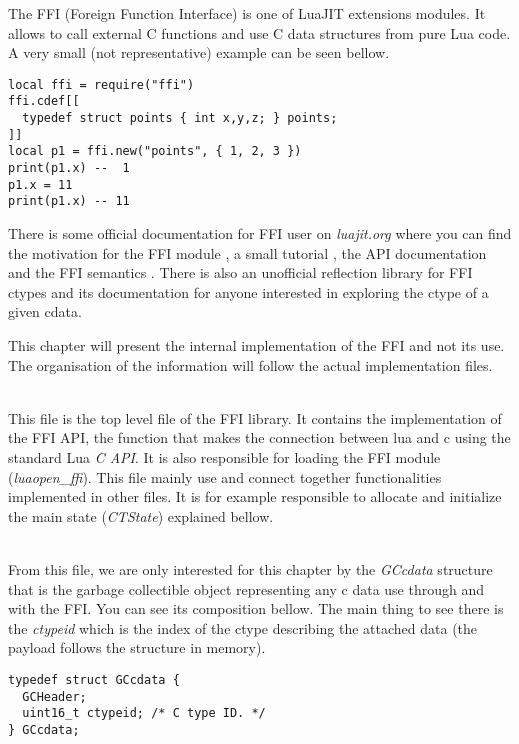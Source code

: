
The FFI (Foreign Function Interface) is one of LuaJIT extensions modules. It
allows to call external C functions and use C data structures from pure Lua code.
A very small (not representative) example can be seen bellow.

\begin{lstlisting}[style=myLuastyle]
local ffi = require("ffi")
ffi.cdef[[
  typedef struct points { int x,y,z; } points;
]]
local p1 = ffi.new("points", { 1, 2, 3 })
print(p1.x) --  1
p1.x = 11
print(p1.x) -- 11
\end{lstlisting}
There is some official documentation for FFI user on \emph{luajit.org}
where you can find the motivation for the FFI module \cite{ffi-motivation},
a small tutorial \cite{ffi-tuto}, the API documentation \cite{ffi-api} and the
FFI semantics \cite{ffi-semantics}. There is also an unofficial reflection
library for FFI ctypes \cite{ffi-reflect} and its documentation
\cite{ffi-reflect-doc} for anyone interested in exploring the ctype of a given cdata.

This chapter will present the internal implementation of the FFI and not its use.
The organisation of the information will follow the actual implementation files.

\\
This file is the top level file of the FFI library. It contains the
implementation of the FFI API, the function that makes the connection between
lua and c using the standard Lua \emph{C API}.
It is also responsible for loading the FFI module (\emph{luaopen\_ffi}).
This file mainly use and connect together functionalities implemented in other
files. It is for example responsible to allocate and initialize the main state
(\emph{CTState}) explained bellow.

\\
From this file, we are only interested for this chapter by the \emph{GCcdata}
structure that is the garbage collectible object representing any c data use
through and with the FFI. You can see its composition bellow. The main thing to
see there is the \emph{ctypeid} which is the index of the ctype describing the
attached data (the payload follows the structure in memory).
\begin{lstlisting}[style=CStyle]
typedef struct GCcdata {
  GCHeader;
  uint16_t ctypeid;	/* C type ID. */
} GCcdata;
\end{lstlisting}


